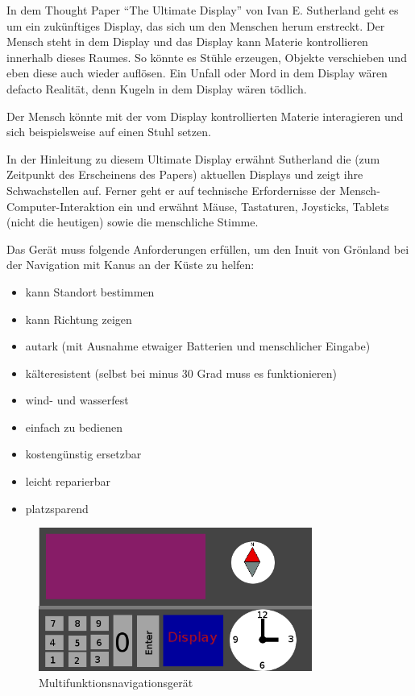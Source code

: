\documentclass[a4paper,10pt]{scrartcl}
\begin{document}
\kopf
\renewcommand{\figurename}{Figure}


In dem Thought Paper "`The Ultimate Display"' von Ivan E. Sutherland geht es um ein zukünftiges Display, das sich um den Menschen herum erstreckt. Der Mensch steht in dem Display und das Display kann Materie kontrollieren innerhalb dieses Raumes. So könnte es Stühle erzeugen, Objekte verschieben und eben diese auch wieder auflösen. Ein Unfall oder Mord in dem Display wären defacto Realität, denn Kugeln in dem Display wären tödlich.

Der Mensch könnte mit der vom Display kontrollierten Materie interagieren und sich beispielsweise auf einen Stuhl setzen.

In der Hinleitung zu diesem Ultimate Display erwähnt Sutherland die (zum Zeitpunkt des Erscheinens des Papers) aktuellen Displays und zeigt ihre Schwachstellen auf. Ferner geht er auf technische Erfordernisse der Mensch-Computer-Interaktion ein und erwähnt Mäuse, Tastaturen, Joysticks, Tablets (nicht die heutigen) sowie die menschliche Stimme.


Das Gerät muss folgende Anforderungen erfüllen, um den Inuit von Grönland bei der Navigation mit Kanus an der Küste zu helfen:

\begin{itemize}
	\item kann Standort bestimmen
	\item kann Richtung zeigen
	\item autark (mit Ausnahme etwaiger Batterien und menschlicher Eingabe)
	\item kälteresistent (selbst bei minus 30 Grad muss es funktionieren)
	\item wind- und wasserfest
	\item einfach zu bedienen
	\item kostengünstig ersetzbar
	\item leicht reparierbar
	\item platzsparend
\end{itemize}

	\begin{figure}[H]
		\centering \includegraphics[width=0.8\textwidth]{images/geraet.png}
		\caption{Multifunktionsnavigationsgerät}
		\label{fig:wwu_logo}
	\end{figure}
\end{document}

